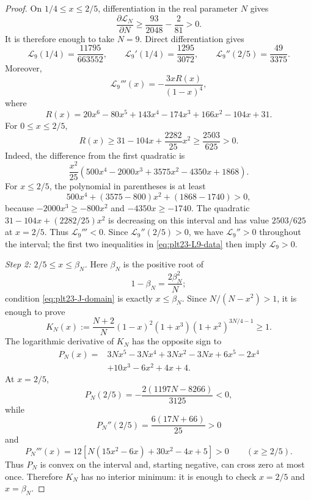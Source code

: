 \documentclass[11pt]{article}
\numberwithin{equation}{section}
\begin{document}
\begin{proof}
  On $1/4\le x\le2/5$, differentiation in the real parameter $N$ gives
  \[
    \frac{\partial\mathcal L_N}{\partial N}
    \ge\frac{93}{2048}-\frac{2}{81}>0.
  \]
  It is therefore enough to take $N=9$.
  Direct differentiation gives
  \begin{equation}\label{eq:plt23-L9-data}
    \mathcal L_9(1/4)=\frac{11795}{663552},
    \qquad
    \mathcal L_9'(1/4)=\frac{1295}{3072},
    \qquad
    \mathcal L_9''(2/5)=\frac{49}{3375}.
  \end{equation}
  Moreover,
  \[
    \mathcal L_9'''(x)=-\frac{3xR(x)}{(1-x)^4},
  \]
  where
  \[
    R(x)=20x^6-80x^5+143x^4-174x^3+166x^2-104x+31.
  \]
  For $0\le x\le2/5$,
  \[
    R(x)\ge31-104x+\frac{2282}{25}x^2
    \ge\frac{2503}{625}>0.
  \]
  Indeed, the difference from the first quadratic is
  \[
    \frac{x^2}{25}
    (500x^4-2000x^3+3575x^2-4350x+1868).
  \]
  For $x\le2/5$, the polynomial in parentheses is at least
  \[
    500x^4+(3575-800)x^2+(1868-1740)>0,
  \]
  because $-2000x^3\ge-800x^2$ and $-4350x\ge-1740$.
  The quadratic $31-104x+(2282/25)x^2$ is decreasing on this interval and has value $2503/625$ at $x=2/5$.
  Thus $\mathcal L_9'''<0$.
  Since $\mathcal L_9''(2/5)>0$, we have $\mathcal L_9''>0$ throughout the interval; the first two inequalities in \eqref{eq:plt23-L9-data} then imply $\mathcal L_9>0$.

  \smallskip
  \noindent\emph{Step 2: $2/5\le x\le\beta_N$.}
  Here $\beta_N$ is the positive root of
  \[
    1-\beta_N=\frac{2\beta_N^2}{N};
  \]
  condition \eqref{eq:plt23-J-domain} is exactly $x\le\beta_N$.
  Since $N/(N-x^2)>1$, it is enough to prove
  \begin{equation}\label{eq:plt23-K-N-def}
    K_N(x):=
    \frac{N+2}{N}(1-x)^2(1+x^3)(1+x^2)^{3N/4-1}\ge1.
  \end{equation}
  The logarithmic derivative of $K_N$ has the opposite sign to
  \begin{align}
    P_N(x)={}&3Nx^5-3Nx^4+3Nx^2-3Nx
    +6x^5-2x^4\\
    &+10x^3-6x^2+4x+4.
    \label{eq:plt23-P-N}
  \end{align}
  At $x=2/5$,
  \[
    P_N(2/5)=-\frac{2(1197N-8266)}{3125}<0,
  \]
  while
  \[
    P_N''(2/5)=\frac{6(17N+66)}{25}>0
  \]
  and
  \[
    P_N'''(x)=12\left[N(15x^2-6x)+30x^2-4x+5\right]>0
    \qquad(x\ge2/5).
  \]
  Thus $P_N$ is convex on the interval and, starting negative, can cross zero at most once.
  Therefore $K_N$ has no interior minimum: it is enough to check $x=2/5$ and $x=\beta_N$.


\end{proof}
\end{document}
